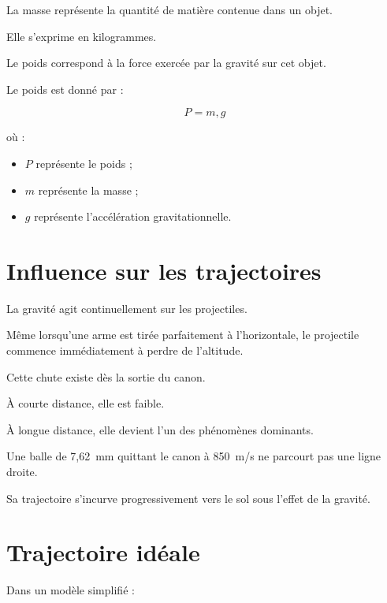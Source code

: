 La masse représente la quantité de matière contenue dans un objet.

Elle s'exprime en kilogrammes.

Le poids correspond à la force exercée par la gravité sur cet objet.

\begin{rigueur}

Le poids est donné par :

\begin{equation}
P = m,g
\label{eq:poids}
\end{equation}

où :

\begin{itemize}
\item $P$ représente le poids ;
\item $m$ représente la masse ;
\item $g$ représente l'accélération gravitationnelle.
\end{itemize}

\end{rigueur}

\section{Influence sur les trajectoires}

La gravité agit continuellement sur les projectiles.

Même lorsqu'une arme est tirée parfaitement à l'horizontale, le projectile
commence immédiatement à perdre de l'altitude.

Cette chute existe dès la sortie du canon.

À courte distance, elle est faible.

À longue distance, elle devient l'un des phénomènes dominants.

\begin{exemple}

Une balle de 7,62~mm quittant le canon à 850~m/s ne parcourt pas une ligne
droite.

Sa trajectoire s'incurve progressivement vers le sol sous l'effet de la
gravité.

\end{exemple}

\section{Trajectoire idéale}

Dans un modèle simplifié :

